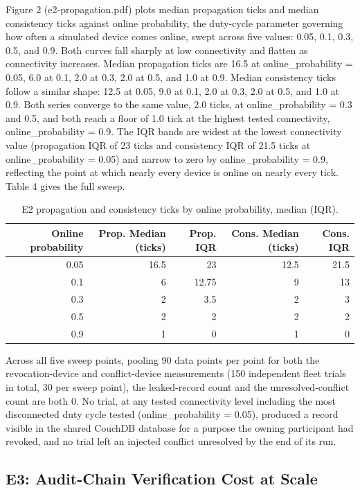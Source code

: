Figure 2 (e2-propagation.pdf) plots median propagation ticks and median consistency ticks against online probability, the duty-cycle parameter governing how often a simulated device comes online, swept across five values: 0.05, 0.1, 0.3, 0.5, and 0.9. Both curves fall sharply at low connectivity and flatten as connectivity increases. Median propagation ticks are 16.5 at online\_probability = 0.05, 6.0 at 0.1, 2.0 at 0.3, 2.0 at 0.5, and 1.0 at 0.9. Median consistency ticks follow a similar shape: 12.5 at 0.05, 9.0 at 0.1, 2.0 at 0.3, 2.0 at 0.5, and 1.0 at 0.9. Both series converge to the same value, 2.0 ticks, at online\_probability = 0.3 and 0.5, and both reach a floor of 1.0 tick at the highest tested connectivity, online\_probability = 0.9. The IQR bands are widest at the lowest connectivity value (propagation IQR of 23 ticks and consistency IQR of 21.5 ticks at online\_probability = 0.05) and narrow to zero by online\_probability = 0.9, reflecting the point at which nearly every device is online on nearly every tick. Table 4 gives the full sweep.

\begin{table}[H]
\caption{E2 propagation and consistency ticks by online probability, median (IQR).\label{tab:t4}}
\small
\begin{tabular}{rrrrr}
\toprule
Online probability & Prop. Median (ticks) & Prop. IQR & Cons. Median (ticks) & Cons. IQR \\
\midrule
0.05 & 16.5 & 23 & 12.5 & 21.5 \\
0.1 & 6 & 12.75 & 9 & 13 \\
0.3 & 2 & 3.5 & 2 & 3 \\
0.5 & 2 & 2 & 2 & 2 \\
0.9 & 1 & 0 & 1 & 0 \\
\bottomrule
\end{tabular}
\end{table}

Across all five sweep points, pooling 90 data points per point for both the revocation-device and conflict-device measurements (150 independent fleet trials in total, 30 per sweep point), the leaked-record count and the unresolved-conflict count are both 0. No trial, at any tested connectivity level including the most disconnected duty cycle tested (online\_probability = 0.05), produced a record visible in the shared CouchDB database for a purpose the owning participant had revoked, and no trial left an injected conflict unresolved by the end of its run.

\subsection{E3: Audit-Chain Verification Cost at Scale}


